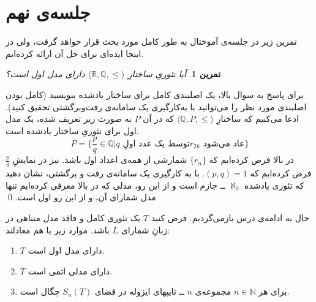 \documentclass[12pt,a4paper]{report}
\theoremstyle{colorhead}
\newtheorem{tam}{تمرین}
\begin{document}
\section{جلسه‌ی نهم}
تمرین زیر در جلسه‌ی آموختال به طور کامل مورد بحث قرار خواهد گرفت، ولی در اینجا ایده‌ای برای حل آن ارائه کرده‌ایم. 
\begin{tam}
آیا تئوریِ ساختارِ
$\langle \mathbb{R},\mathbb{Q},\leq \rangle$
دارای مدل اول است؟
\end{tam}
برای پاسخ به سوال بالا، یک اصلبندی کامل برای ساختار یادشده بنویسید (کامل بودن اصلبندی مورد نظر را می‌توانید با به‌کارگیری یک سامانه‌ی رفت‌وبرگشتی تحقیق کنید).
ادعا می‌کنیم که  
ساختارِ
$\langle \mathbb{Q}, P,\leq\rangle$
که در آن
$P$
به صورت زیر تعریف شده،  یک مدل اول برای تئوریِ ساختار یادشده است.
\[
P=\{\frac{p}{q}\in \mathbb{Q}|\text{$q$ توسط یک عدد اولِ
$r_{2k}$ عاد می‌شود}\}
\]
در بالا فرض کرده‌ایم که
$\{r_n\}$
شمارشی از همه‌ی اعداد اول باشد. نیز در نمایشِ
$\frac{p}{q}$
فرض کرده‌ایم که
$(p,q)=1$.
با به کارگیری یک سامانه‌ی رفت و برگشتی، نشان دهید که تئوری یادشده 
$\aleph_0$
ــ
جازم است و از این رو، مدلی که در بالا معرفی کرده‌ایم تنها مدل شمارای آن، و از این رو اول است.
\qed
\par 
حال به ادامه‌ی درس بازمی‌گردیم. 
فرض کنید 
$T$
یک تئوری کامل و فاقد مدل متناهی در زبانِ شمارای 
$L$
باشد. موارد زیر با هم معادلند:
\begin{enumerate}
\item 
$T$
دارای مدل اول است.
\item 
$T$
دارای مدلی اتمی است.
\item 
برای هر
$n\in \mathbb{N}$
مجموعه‌ی
$n$
ــ
تایپهای ایزوله در فضای
$S_n(T)$
چگال است. 
\end{enumerate}
\end{document}

